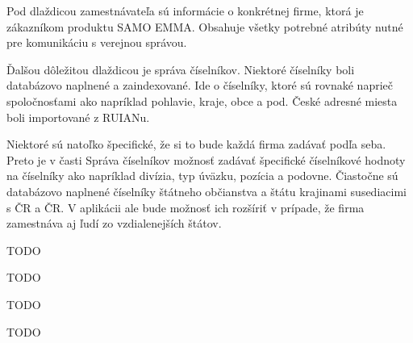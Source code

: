 Pod dlaždicou zamestnávateľa sú informácie o konkrétnej firme, ktorá je zákazníkom produktu SAMO EMMA. Obsahuje všetky potrebné atribúty nutné pre komunikáciu s verejnou správou.

Ďalšou dôležitou dlaždicou je správa číselníkov. Niektoré číselníky boli databázovo naplnené a zaindexované. Ide o číselníky, ktoré sú rovnaké naprieč spoločnosťami ako napríklad pohlavie, kraje, obce a pod. České adresné miesta boli importované z RUIANu.

Niektoré sú natoľko špecifické, že si to bude každá firma zadávať podľa seba. Preto je v časti Správa číselníkov možnosť zadávať špecifické číselníkové hodnoty na číselníky ako napríklad divízia, typ úväzku, pozícia a podovne. Čiastočne sú databázovo naplnené číselníky štátneho občianstva a štátu krajinami susediacimi s ČR a ČR. V aplikácii ale bude možnosť ich rozšíriť v prípade, že firma zamestnáva aj ľudí zo vzdialenejších štátov.




\TODO
TODO


\TODO
TODO



\TODO
TODO


\TODO
TODO


\bbib





